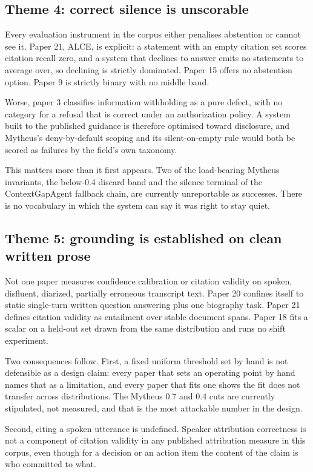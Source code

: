 \subsection{Theme 4: correct silence is unscorable}

Every evaluation instrument in the corpus either penalises abstention or
cannot see it. Paper 21, ALCE, is explicit: a statement with an empty citation
set scores citation recall zero, and a system that declines to answer emits no
statements to average over, so declining is strictly dominated. Paper 15
offers no abstention option. Paper 9 is strictly binary with no middle band.

Worse, paper 3 classifies information withholding as a pure defect, with no
category for a refusal that is correct under an authorization policy. A system
built to the published guidance is therefore optimised toward disclosure, and
Mytheus's deny-by-default scoping and its silent-on-empty rule would both be
scored as failures by the field's own taxonomy.

This matters more than it first appears. Two of the load-bearing Mytheus
invariants, the below-0.4 discard band and the silence terminal of the
ContextGapAgent fallback chain, are currently unreportable as successes. There
is no vocabulary in which the system can say it was right to stay quiet.

\subsection{Theme 5: grounding is established on clean written prose}

Not one paper measures confidence calibration or citation validity on spoken,
disfluent, diarized, partially erroneous transcript text. Paper 20 confines
itself to static single-turn written question answering plus one biography
task. Paper 21 defines citation validity as entailment over stable document
spans. Paper 18 fits a scalar on a held-out set drawn from the same
distribution and runs no shift experiment.

Two consequences follow. First, a fixed uniform threshold set by hand is not
defensible as a design claim: every paper that sets an operating point by hand
names that as a limitation, and every paper that fits one shows the fit does
not transfer across distributions. The Mytheus 0.7 and 0.4 cuts are currently
stipulated, not measured, and that is the most attackable number in the
design.

Second, citing a spoken utterance is undefined. Speaker attribution
correctness is not a component of citation validity in any published
attribution measure in this corpus, even though for a decision or an action
item the content of the claim is who committed to what.

